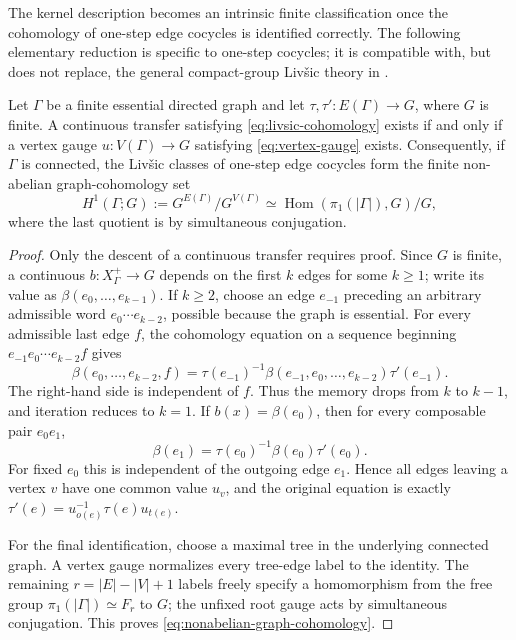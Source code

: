 The kernel description becomes an intrinsic finite classification once the
cohomology of one-step edge cocycles is identified correctly.  The following
elementary reduction is specific to one-step cocycles; it is compatible with,
but does not replace, the general compact-group Liv\v{s}ic theory in
\cite{ParryPollicott1997LivsicCompactLie,Parry1999LivsicNonAbelian}.

\begin{proposition}
  \label{prop:one-step-livsic-vertex-reduction}
  Let \(\Gamma\) be a finite essential directed graph and let
  \(\tau,\tau':E(\Gamma)\to G\), where \(G\) is finite.  A continuous
  transfer satisfying \eqref{eq:livsic-cohomology} exists if and only if a
  vertex gauge \(u:V(\Gamma)\to G\) satisfying
  \eqref{eq:vertex-gauge} exists.  Consequently, if \(\Gamma\) is connected,
  the Liv\v{s}ic classes of one-step edge cocycles form the finite non-abelian
  graph-cohomology set
  \begin{equation}\label{eq:nonabelian-graph-cohomology}
    H^1(\Gamma;G):=G^{E(\Gamma)}/G^{V(\Gamma)}
    \simeq \operatorname{Hom}(\pi_1(|\Gamma|),G)/G,
  \end{equation}
  where the last quotient is by simultaneous conjugation.
\end{proposition}

\begin{proof}
  Only the descent of a continuous transfer requires proof.  Since \(G\) is
  finite, a continuous \(b:X_\Gamma^+\to G\) depends on the first \(k\)
  edges for some \(k\geq1\); write its value as
  \(\beta(e_0,\ldots,e_{k-1})\).  If \(k\geq2\), choose an edge \(e_{-1}\)
  preceding an arbitrary admissible word
  \(e_0\cdots e_{k-2}\), possible because the graph is essential.  For every
  admissible last edge \(f\), the cohomology equation on a sequence beginning
  \(e_{-1}e_0\cdots e_{k-2}f\) gives
  \[
    \beta(e_0,\ldots,e_{k-2},f)
    =\tau(e_{-1})^{-1}
      \beta(e_{-1},e_0,\ldots,e_{k-2})\tau'(e_{-1}).
  \]
  The right-hand side is independent of \(f\).  Thus the memory drops from
  \(k\) to \(k-1\), and iteration reduces to \(k=1\).  If
  \(b(x)=\beta(e_0)\), then for every composable pair \(e_0e_1\),
  \[
    \beta(e_1)=\tau(e_0)^{-1}\beta(e_0)\tau'(e_0).
  \]
  For fixed \(e_0\) this is independent of the outgoing edge \(e_1\).
  Hence all edges leaving a vertex \(v\) have one common value \(u_v\), and
  the original equation is exactly
  \(\tau'(e)=u_{o(e)}^{-1}\tau(e)u_{t(e)}\).

  For the final identification, choose a maximal tree in the underlying
  connected graph.  A vertex gauge normalizes every tree-edge label to the
  identity.  The remaining
  \(r=|E|-|V|+1\) labels freely specify a homomorphism from the free group
  \(\pi_1(|\Gamma|)\simeq F_r\) to \(G\); the unfixed root gauge acts by
  simultaneous conjugation.  This proves \eqref{eq:nonabelian-graph-cohomology}.
\end{proof}

